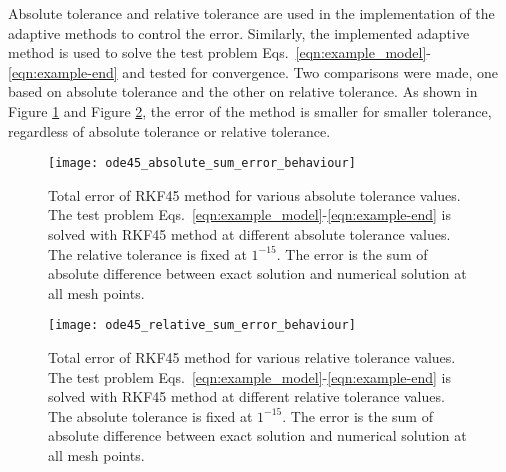 Absolute tolerance and relative tolerance are used in the implementation of the adaptive methods to control the error. Similarly, the implemented adaptive method is used to solve the test problem Eqs.~\eqref{eqn:example_model}-\eqref{eqn:example-end} and tested for convergence. Two comparisons were made, one based on absolute tolerance and the other on relative tolerance. As shown in Figure \ref{fig:ode45_absolute_sum_error_behaviour} and Figure \ref{fig:ode45_relative_sum_error_behaviour}, the error of the method is smaller for smaller tolerance, regardless of absolute tolerance or relative tolerance.

\begin{figure}
    \texttt{[image: ode45\_absolute\_sum\_error\_behaviour]}
    \caption{Total error of RKF45 method for various absolute tolerance values. The test problem Eqs.~\eqref{eqn:example_model}-\eqref{eqn:example-end} is solved with RKF45 method at different absolute tolerance values. The relative tolerance is fixed at $1^{-15}$. The error is the sum of absolute difference between exact solution and numerical solution at all mesh points.}
    \label{fig:ode45_absolute_sum_error_behaviour}
\end{figure}

\begin{figure}
    \texttt{[image: ode45\_relative\_sum\_error\_behaviour]}
    \caption{Total error of RKF45 method for various relative tolerance values. The test problem Eqs.~\eqref{eqn:example_model}-\eqref{eqn:example-end} is solved with RKF45 method at different relative tolerance values. The absolute tolerance is fixed at $1^{-15}$. The error is the sum of absolute difference between exact solution and numerical solution at all mesh points.}
    \label{fig:ode45_relative_sum_error_behaviour}
\end{figure}
